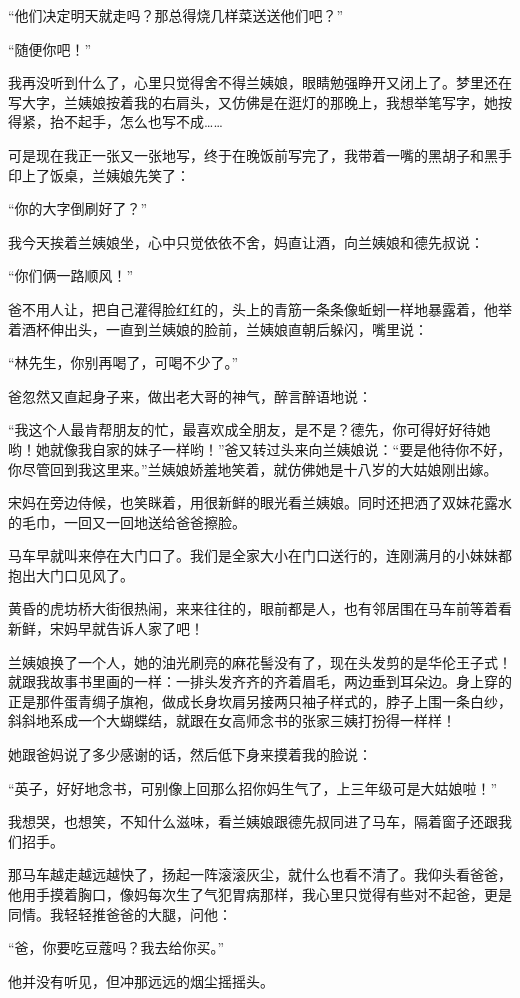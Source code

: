 \par “他们决定明天就走吗？那总得烧几样菜送送他们吧？”
\par “随便你吧！”
\par 我再没听到什么了，心里只觉得舍不得兰姨娘，眼睛勉强睁开又闭上了。梦里还在写大字，兰姨娘按着我的右肩头，又仿佛是在逛灯的那晚上，我想举笔写字，她按得紧，抬不起手，怎么也写不成……
\par 可是现在我正一张又一张地写，终于在晚饭前写完了，我带着一嘴的黑胡子和黑手印上了饭桌，兰姨娘先笑了：
\par “你的大字倒刷好了？”
\par 我今天挨着兰姨娘坐，心中只觉依依不舍，妈直让酒，向兰姨娘和德先叔说：
\par “你们俩一路顺风！”
\par 爸不用人让，把自己灌得脸红红的，头上的青筋一条条像蚯蚓一样地暴露着，他举着酒杯伸出头，一直到兰姨娘的脸前，兰姨娘直朝后躲闪，嘴里说：
\par “林先生，你别再喝了，可喝不少了。”
\par 爸忽然又直起身子来，做出老大哥的神气，醉言醉语地说：
\par “我这个人最肯帮朋友的忙，最喜欢成全朋友，是不是？德先，你可得好好待她哟！她就像我自家的妹子一样哟！”爸又转过头来向兰姨娘说：“要是他待你不好，你尽管回到我这里来。”兰姨娘娇羞地笑着，就仿佛她是十八岁的大姑娘刚出嫁。
\par 宋妈在旁边侍候，也笑眯着，用很新鲜的眼光看兰姨娘。同时还把洒了双妹花露水的毛巾，一回又一回地送给爸爸擦脸。
\par 马车早就叫来停在大门口了。我们是全家大小在门口送行的，连刚满月的小妹妹都抱出大门口见风了。
\par 黄昏的虎坊桥大街很热闹，来来往往的，眼前都是人，也有邻居围在马车前等着看新鲜，宋妈早就告诉人家了吧！
\par 兰姨娘换了一个人，她的油光刷亮的麻花髻没有了，现在头发剪的是华伦王子式！就跟我故事书里画的一样：一排头发齐齐的齐着眉毛，两边垂到耳朵边。身上穿的正是那件蛋青绸子旗袍，做成长身坎肩另接两只袖子样式的，脖子上围一条白纱，斜斜地系成一个大蝴蝶结，就跟在女高师念书的张家三姨打扮得一样样！
\par 她跟爸妈说了多少感谢的话，然后低下身来摸着我的脸说：
\par “英子，好好地念书，可别像上回那么招你妈生气了，上三年级可是大姑娘啦！”
\par 我想哭，也想笑，不知什么滋味，看兰姨娘跟德先叔同进了马车，隔着窗子还跟我们招手。
\par 那马车越走越远越快了，扬起一阵滚滚灰尘，就什么也看不清了。我仰头看爸爸，他用手摸着胸口，像妈每次生了气犯胃病那样，我心里只觉得有些对不起爸，更是同情。我轻轻推爸爸的大腿，问他：
\par “爸，你要吃豆蔻吗？我去给你买。”
\par 他并没有听见，但冲那远远的烟尘摇摇头。







